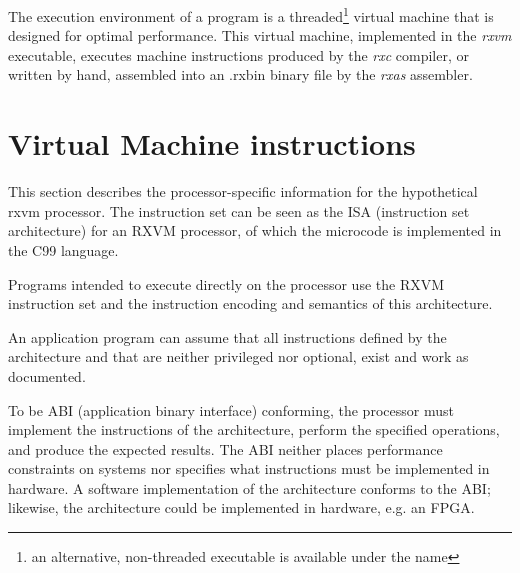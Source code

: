 The execution environment of a \crexx{} program is a
threaded\footnote{an alternative, non-threaded executable is available
  under the \emph{} name} virtual
machine that is designed for optimal performance. This virtual
machine, implemented in the \emph{rxvm} executable, executes
machine instructions produced by the \emph{rxc} \crexx{}
compiler, or written by hand, assembled into an .rxbin binary file by
the \emph{rxas} assembler.



\section{\crexx{} Virtual Machine instructions}

This section describes the processor-specific information for the
hypothetical rxvm processor.  The instruction set can be seen as the ISA
(instruction set architecture) for an RXVM processor, of which the microcode is implemented in the C99 language.

Programs intended to execute directly on the processor use the
RXVM instruction set and the
instruction encoding and semantics of this architecture.

An application program can assume that all instructions defined by the
architecture and that are neither privileged nor optional, exist and work
as documented.

To be ABI (application binary interface) conforming, the processor must implement the instructions of
the architecture, perform the specified operations, and produce the
expected results.  The ABI neither places performance constraints on
systems nor specifies what instructions must be implemented in
hardware.  A software implementation of the architecture conforms to
the ABI; likewise, the architecture could be implemented in hardware,
e.g. an FPGA.

